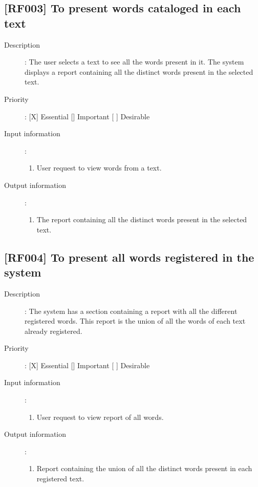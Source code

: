 \documentclass[11pt, twoside, a4paper]{book}
\begin{document}
			\subsection{[RF003] To present words cataloged in each text}
				
				\begin{description}
				
					\item[Description]: The user selects a text to see all the words present in it. The system displays a report containing all the distinct words present in the selected text.
					\item[Priority]: [X] Essential [] Important [ ] Desirable
					\item[Input information]:
						\begin{enumerate}

							\item User request to view words from a text.
							
						\end{enumerate}
					\item[Output information]:
						\begin{enumerate}
						
							\item The report containing all the distinct words present in the selected text.

						\end{enumerate}
	
				\end{description}
			
			\subsection{[RF004] To present all words registered in the system}
				
				\begin{description}
				
					\item[Description]: The system has a section containing a report with all the different registered words. This report is the union of all the words of each text already registered.
					\item[Priority]: [X] Essential [] Important [ ] Desirable
					\item[Input information]:
						\begin{enumerate}

							\item User request to view report of all words.
							
						\end{enumerate}
					\item[Output information]:
						\begin{enumerate}
						
							\item Report containing the union of all the distinct words present in each registered text.
																					
						\end{enumerate}
	
				\end{description}
		
\end{document}
